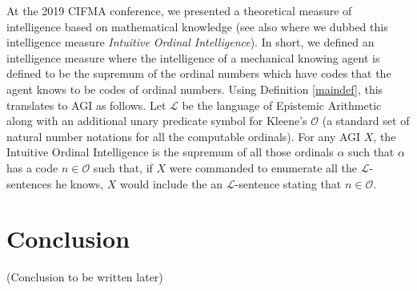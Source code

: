 \documentclass[runningheads]{llncs}
\begin{document}
At the 2019 CIFMA conference, we presented \cite{alexander2019measuring}
a theoretical measure of intelligence based on mathematical knowledge
(see also \cite{alexander2020agi} where we dubbed this intelligence
measure \emph{Intuitive Ordinal Intelligence}).
In short, we defined an intelligence measure where the intelligence of
a mechanical knowing agent is defined to be the supremum of the
ordinal numbers which have codes that the agent knows to be codes
of ordinal numbers. Using Definition \ref{maindef}, this translates
to AGI as follows. Let $\mathscr L$ be the language of Epistemic Arithmetic
along with an additional unary predicate symbol for Kleene's $\mathcal O$
(a standard set of natural number notations for all the computable
ordinals). For any AGI $X$, the Intuitive Ordinal Intelligence is the
supremum of all those ordinals $\alpha$ such that $\alpha$ has a code
$n\in\mathcal O$ such that, if $X$ were commanded to enumerate all the
$\mathscr L$-sentences he knows, $X$ would include the an $\mathscr L$-sentence
stating that $n\in\mathcal O$.


\section{Conclusion}
\label{conclusionsection}

(Conclusion to be written later)



\end{document}
